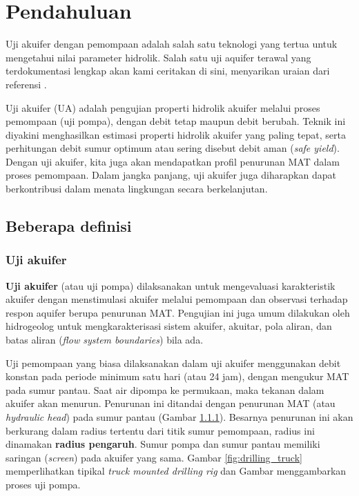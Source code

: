 \section{Pendahuluan}

Uji akuifer dengan pemompaan adalah salah satu teknologi yang tertua untuk mengetahui nilai parameter hidrolik. Salah satu uji aquifer terawal yang terdokumentasi lengkap akan kami ceritakan di sini, menyarikan uraian dari referensi \cite{kruseman1994analysis}.

Uji akuifer (UA) adalah pengujian properti hidrolik akuifer melalui proses pemompaan (uji pompa), dengan debit tetap maupun debit berubah. Teknik ini diyakini menghasilkan estimasi properti hidrolik akuifer yang paling tepat, serta perhitungan debit sumur optimum atau sering disebut debit aman (\textit{safe yield}). Dengan uji akuifer, kita juga akan mendapatkan profil penurunan MAT dalam proses pemompaan. Dalam jangka panjang, uji akuifer juga diharapkan dapat berkontribusi dalam menata lingkungan secara berkelanjutan. 
\subsection{Beberapa definisi}

\subsubsection{Uji akuifer}

\textbf{Uji akuifer} (atau uji pompa) dilaksanakan untuk mengevaluasi karakteristik akuifer dengan menstimulasi akuifer melalui pemompaan dan observasi terhadap respon aquifer berupa penurunan MAT. Pengujian ini juga umum dilakukan oleh hidrogeolog untuk mengkarakterisasi sistem akuifer, akuitar, pola aliran, dan batas aliran (\textit{flow system boundaries}) bila ada. 

Uji pemompaan yang biasa dilaksanakan dalam uji akuifer menggunakan debit konstan pada periode minimum satu hari (atau 24 jam), dengan mengukur MAT pada sumur pantau. Saat air dipompa ke permukaan, maka tekanan dalam akuifer akan menurun. Penurunan ini ditandai dengan penurunan MAT (atau \textit{hydraulic head}) pada sumur pantau (Gambar \ref{}). Besarnya penurunan ini akan berkurang dalam radius tertentu dari titik sumur pemompaan, radius ini dinamakan \textbf{radius pengaruh}. Sumur pompa dan sumur pantau memiliki saringan (\textit{screen}) pada akuifer yang sama. Gambar \ref{fig:drilling_truck} memperlihatkan tipikal \textit{truck mounted drilling rig} dan Gambar \label{fig:pumping_diagram} menggambarkan proses uji pompa.

